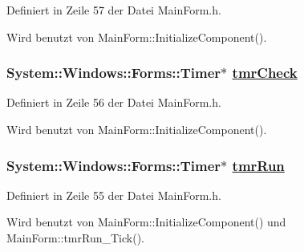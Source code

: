 Definiert in Zeile 57 der Datei Main\-Form.h.

Wird benutzt von Main\-Form::Initialize\-Component().\hypertarget{classQbeNDI_1_1MainForm_QbeNDI_1_1MainFormr3}{
\subsubsection[tmrCheck]{\setlength{\rightskip}{0pt plus 5cm}System::Windows::Forms::Timer$\ast$ \hyperlink{classQbeNDI_1_1MainForm_QbeNDI_1_1MainFormr3}{tmr\-Check}}}
\label{classQbeNDI_1_1MainForm_QbeNDI_1_1MainFormr3}




Definiert in Zeile 56 der Datei Main\-Form.h.

Wird benutzt von Main\-Form::Initialize\-Component().\hypertarget{classQbeNDI_1_1MainForm_QbeNDI_1_1MainFormr2}{
\subsubsection[tmrRun]{\setlength{\rightskip}{0pt plus 5cm}System::Windows::Forms::Timer$\ast$ \hyperlink{classQbeNDI_1_1MainForm_QbeNDI_1_1MainFormr2}{tmr\-Run}}}
\label{classQbeNDI_1_1MainForm_QbeNDI_1_1MainFormr2}




Definiert in Zeile 55 der Datei Main\-Form.h.

Wird benutzt von Main\-Form::Initialize\-Component() und Main\-Form::tmr\-Run\_\-Tick().